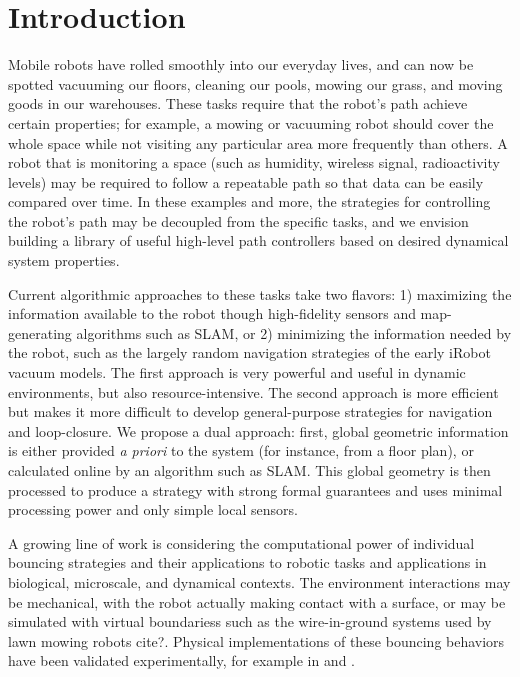 \documentclass[]{styles/svproc}  %
\begin{document}
\section{Introduction}

Mobile robots have rolled smoothly into our everyday lives, and can now be
spotted vacuuming our floors, cleaning our pools, mowing our grass, and moving
goods in our warehouses. These tasks require that the robot's path achieve certain properties; for example, a mowing or
vacuuming robot should cover the whole space while not visiting 
any particular area more frequently than others. A robot that is monitoring a space 
(such as humidity, wireless signal, radioactivity levels) may be
required to follow a repeatable path so that data can be easily compared 
over time. In these examples and more, the strategies for controlling the robot's
path may be decoupled from the specific tasks, and we envision building a
library of useful high-level path controllers based on desired dynamical system
properties.

Current algorithmic approaches to these tasks take two flavors: 1)
maximizing the information available to the robot though high-fidelity sensors
and map-generating algorithms such as SLAM, or 2) minimizing the information needed
by the robot, such as the largely random navigation strategies of the early
iRobot vacuum models. The first approach is very powerful and useful in
dynamic environments, but also
resource-intensive.  The second approach 
is more efficient but makes it more difficult to develop general-purpose strategies 
for navigation and loop-closure. We propose a dual
approach: first, global geometric information is either provided \emph{a
priori} to the system (for instance, from a floor plan), or calculated online by
an algorithm such as SLAM. This global geometry is then processed to produce
a strategy with strong formal guarantees and uses minimal processing power 
and only simple local sensors.


A growing line of work is considering the computational power of individual bouncing strategies
and their applications to robotic tasks and applications in biological, microscale, 
and dynamical contexts. The environment interactions may be mechanical,
with the robot actually making contact with a surface, or may be simulated with
virtual boundariess such as the wire-in-ground systems used by lawn mowing robots
{\color{red} cite?}. Physical implementations of these bouncing behaviors have
been validated experimentally, for example in \cite{LewOKa13} and
\cite{alam2018space}.
\end{document}
